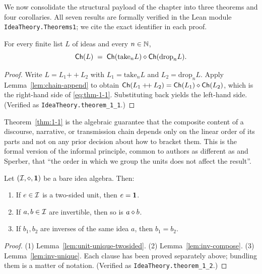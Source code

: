 We now consolidate the structural payload of the chapter into three
theorems and four corollaries.  All seven results are formally verified
in the Lean module \texttt{IdeaTheory.Theorems1}; we cite the exact
identifier in each proof.

\begin{theorem}\label{thm:1-1}
For every finite list $L$ of ideas and every $n \in \mathbb{N}$,
\begin{equation}\label{eq:thm-1-1}
\mathsf{Ch}(L)
\;=\; \mathsf{Ch}(\mathrm{take}_n L) \mathbin{\diamond} \mathsf{Ch}(\mathrm{drop}_n L).
\end{equation}
\end{theorem}

\begin{proof}
Write $L = L_1 \mathbin{+\!+} L_2$ with $L_1 = \mathrm{take}_n L$ and
$L_2 = \mathrm{drop}_n L$.  Apply Lemma~\ref{lem:chain-append} to obtain
$\mathsf{Ch}(L_1 \mathbin{+\!+} L_2) = \mathsf{Ch}(L_1) \mathbin{\diamond} \mathsf{Ch}(L_2)$, which
is the right-hand side of \eqref{eq:thm-1-1}.  Substituting back yields
the left-hand side.  (Verified as \texttt{IdeaTheory.theorem\_1\_1}.)
\end{proof}

Theorem~\ref{thm:1-1} is the algebraic guarantee that the composite
content of a discourse, narrative, or transmission chain depends only on
the linear order of its parts and not on any prior decision about how to
bracket them.  This is the formal version of the informal principle,
common to authors as different as \cite{Hume1739} and Sperber, that ``the
order in which we group the units does not affect the result''.

\begin{theorem}\label{thm:1-2}
Let $(\mathcal{I},\mathbin{\diamond},\mathbf{1})$ be a bare idea algebra.  Then:
\begin{enumerate}
\item If $e \in \mathcal{I}$ is a two-sided unit, then $e = \mathbf{1}$.
\item If $a, b \in \mathcal{I}$ are invertible, then so is $a \mathbin{\diamond} b$.
\item If $b_1, b_2$ are inverses of the same idea $a$, then $b_1 = b_2$.
\end{enumerate}
\end{theorem}

\begin{proof}
(1) Lemma~\ref{lem:unit-unique-twosided}.  (2)
Lemma~\ref{lem:inv-compose}.  (3) Lemma~\ref{lem:inv-unique}.  Each
clause has been proved separately above; bundling them is a matter of
notation.  (Verified as \texttt{IdeaTheory.theorem\_1\_2}.)
\end{proof}

